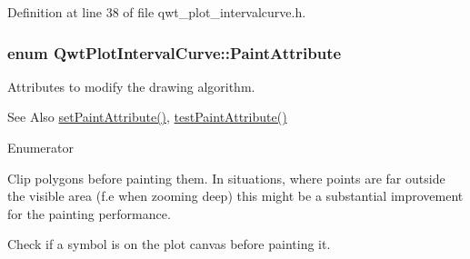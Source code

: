 Definition at line 38 of file qwt\-\_\-plot\-\_\-intervalcurve.\-h.

\hypertarget{class_qwt_plot_interval_curve_a3deaf543802d69a38961f9e944bfad95}{
\subsubsection[{Paint\-Attribute}]{\setlength{\rightskip}{0pt plus 5cm}enum {\bf Qwt\-Plot\-Interval\-Curve\-::\-Paint\-Attribute}}}\label{class_qwt_plot_interval_curve_a3deaf543802d69a38961f9e944bfad95}
Attributes to modify the drawing algorithm. \begin{DoxySeeAlso}{See Also}
\hyperlink{class_qwt_plot_interval_curve_ab962c4ad6896bc9d9450f6436f00bd81}{set\-Paint\-Attribute()}, \hyperlink{class_qwt_plot_interval_curve_ac8a923fcf205493466e1e086eecec8b7}{test\-Paint\-Attribute()} 
\end{DoxySeeAlso}
\begin{Desc}
\item[Enumerator]\par
\begin{description}
\item[{\em 
\hypertarget{class_qwt_plot_interval_curve_a3deaf543802d69a38961f9e944bfad95aac1361651d57a0df1a079f30849e72a1}{Clip\-Polygons}\label{class_qwt_plot_interval_curve_a3deaf543802d69a38961f9e944bfad95aac1361651d57a0df1a079f30849e72a1}
}]Clip polygons before painting them. In situations, where points are far outside the visible area (f.\-e when zooming deep) this might be a substantial improvement for the painting performance. \item[{\em 
\hypertarget{class_qwt_plot_interval_curve_a3deaf543802d69a38961f9e944bfad95a9b164d29534731bbd3d34717baf399ca}{Clip\-Symbol}\label{class_qwt_plot_interval_curve_a3deaf543802d69a38961f9e944bfad95a9b164d29534731bbd3d34717baf399ca}
}]Check if a symbol is on the plot canvas before painting it. \end{description}
\end{Desc}


